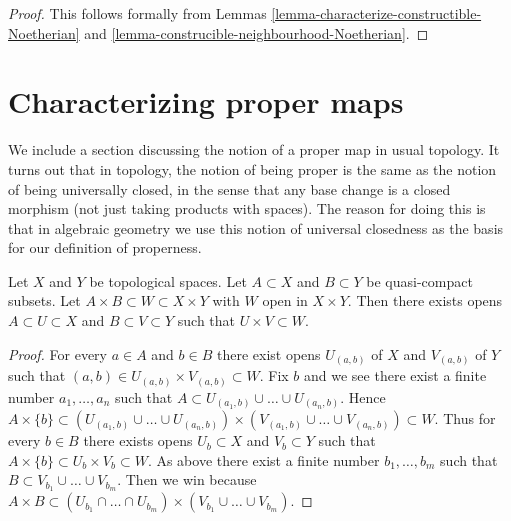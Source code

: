 \begin{proof}
This follows formally from
Lemmas \ref{lemma-characterize-constructible-Noetherian} and
\ref{lemma-construcible-neighbourhood-Noetherian}.
\end{proof}









\section{Characterizing proper maps}
\label{section-proper}

\noindent
We include a section discussing the notion of a proper map in usual
topology. It turns out that in topology, the notion of being proper
is the same as the notion of being universally closed, in the sense
that any base change is a closed morphism (not just taking products
with spaces). The reason for doing this is that in algebraic geometry
we use this notion of universal closedness as the basis for our
definition of properness.

\begin{lemma}
\label{lemma-tube}
Let $X$ and $Y$ be topological spaces.
Let $A \subset X$ and $B \subset Y$ be quasi-compact subsets.
Let $A \times B \subset W \subset X \times Y$ with $W$
open in $X \times Y$. Then there exists opens $A \subset U \subset X$
and $B \subset V \subset Y$ such that $U \times V \subset W$.
\end{lemma}

\begin{proof}
For every $a \in A$ and $b \in B$ there exist opens
$U_{(a, b)}$ of $X$ and $V_{(a, b)}$ of $Y$ such that
$(a, b) \in U_{(a, b)} \times V_{(a, b)} \subset W$.
Fix $b$ and we see there exist a finite number $a_1, \ldots, a_n$
such that $A \subset U_{(a_1, b)} \cup \ldots \cup U_{(a_n, b)}$.
Hence $A \times \{b\} \subset
(U_{(a_1, b)} \cup \ldots \cup U_{(a_n, b)}) \times
(V_{(a_1, b)} \cup \ldots \cup V_{(a_n, b)}) \subset W$.
Thus for every $b \in B$ there exists opens $U_b \subset X$ and
$V_b \subset Y$ such that $A \times \{b\} \subset U_b \times V_b \subset W$.
As above there exist a finite number $b_1, \ldots, b_m$ such
that $B \subset V_{b_1} \cup \ldots \cup V_{b_m}$.
Then we win because
$A \times B \subset
(U_{b_1} \cap \ldots \cap U_{b_m}) \times
(V_{b_1} \cup \ldots \cup V_{b_m})$.
\end{proof}

